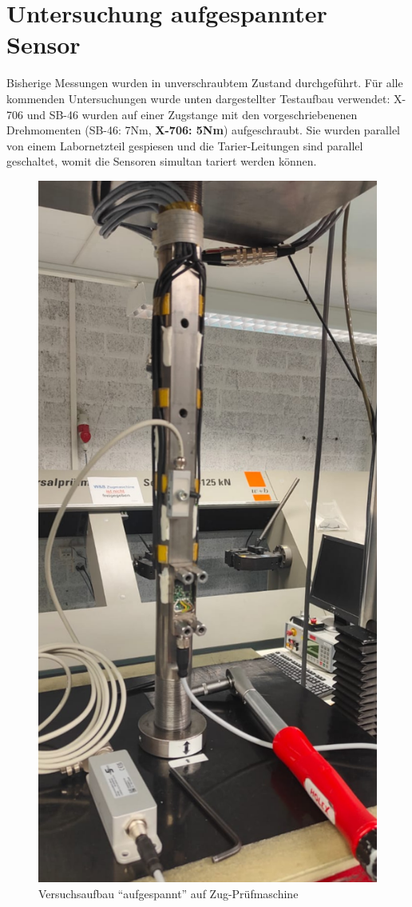\documentclass[12pt,a4paper]{article}
\begin{document}
	\section{Untersuchung aufgespannter Sensor}
	Bisherige Messungen wurden in unverschraubtem Zustand durchgeführt. Für alle kommenden Untersuchungen wurde unten dargestellter Testaufbau verwendet: X-706 und SB-46 wurden auf einer Zugstange mit den vorgeschriebenenen Drehmomenten (SB-46: 7Nm, \textbf{X-706: 5Nm}) aufgeschraubt. Sie wurden parallel von einem Labornetzteil gespiesen und die Tarier-Leitungen sind parallel geschaltet, womit die Sensoren simultan tariert werden können.
	\begin{figure}[H]
		\centering
		\includegraphics[width=0.5\linewidth]{"Imgs/Aufbau Zugstange"}
		\caption{Versuchsaufbau ``aufgespannt'' auf Zug-Prüfmaschine}
		\label{fig:aufbau-zugstange}
	\end{figure}
\end{document}
